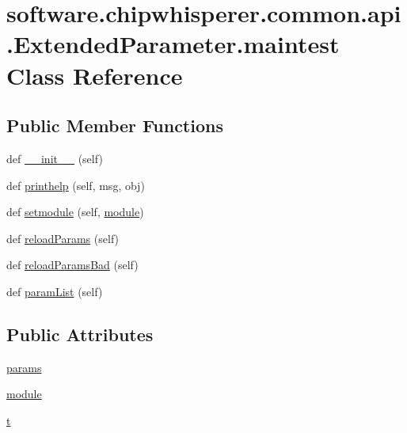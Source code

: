 \hypertarget{classsoftware_1_1chipwhisperer_1_1common_1_1api_1_1ExtendedParameter_1_1maintest}{}\section{software.\+chipwhisperer.\+common.\+api.\+Extended\+Parameter.\+maintest Class Reference}
\label{classsoftware_1_1chipwhisperer_1_1common_1_1api_1_1ExtendedParameter_1_1maintest}
\subsection*{Public Member Functions}
\begin{DoxyCompactItemize}
\item 
def \hyperlink{classsoftware_1_1chipwhisperer_1_1common_1_1api_1_1ExtendedParameter_1_1maintest_a290d0cbb308ffd9acac2f77ae6e1c726}{\+\_\+\+\_\+init\+\_\+\+\_\+} (self)
\item 
def \hyperlink{classsoftware_1_1chipwhisperer_1_1common_1_1api_1_1ExtendedParameter_1_1maintest_a454f447369cf0b4c8dae7ebc1cf99458}{printhelp} (self, msg, obj)
\item 
def \hyperlink{classsoftware_1_1chipwhisperer_1_1common_1_1api_1_1ExtendedParameter_1_1maintest_aa27fb7cb18340e9454571e41a375eac1}{setmodule} (self, \hyperlink{classsoftware_1_1chipwhisperer_1_1common_1_1api_1_1ExtendedParameter_1_1module}{module})
\item 
def \hyperlink{classsoftware_1_1chipwhisperer_1_1common_1_1api_1_1ExtendedParameter_1_1maintest_ac04a77a66b50d1e1b9911b7ea29eddd6}{reload\+Params} (self)
\item 
def \hyperlink{classsoftware_1_1chipwhisperer_1_1common_1_1api_1_1ExtendedParameter_1_1maintest_a9430a1d756d2ae02be2202eeebce01c1}{reload\+Params\+Bad} (self)
\item 
def \hyperlink{classsoftware_1_1chipwhisperer_1_1common_1_1api_1_1ExtendedParameter_1_1maintest_a606a166e28d055ecec331cb4172f9fe4}{param\+List} (self)
\end{DoxyCompactItemize}
\subsection*{Public Attributes}
\begin{DoxyCompactItemize}
\item 
\hyperlink{classsoftware_1_1chipwhisperer_1_1common_1_1api_1_1ExtendedParameter_1_1maintest_aefa1ef95d164e89a25d411223e78f525}{params}
\item 
\hyperlink{classsoftware_1_1chipwhisperer_1_1common_1_1api_1_1ExtendedParameter_1_1maintest_ad6bf58713cf6c1d36d9774022c5539cd}{module}
\item 
\hyperlink{classsoftware_1_1chipwhisperer_1_1common_1_1api_1_1ExtendedParameter_1_1maintest_adf9172b5d72cabec43fbb73e5b4775d2}{t}
\end{DoxyCompactItemize}
